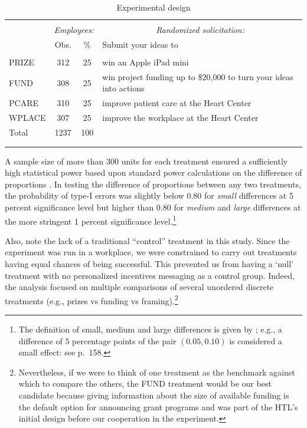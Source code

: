 \documentclass[11pt, titlepage]{article}
\begin{document}
\begin{table}
\centering
\caption{Experimental design}
\label{experimental-design}
\begin{tabular}{@{}lccp{10cm}}
  \\[-1.8ex]\hline \hline \\[-1.8ex]
 & \multicolumn{2}{c}{\emph{Employees:}}& \multicolumn{1}{c}{\emph{Randomized solicitation:}}\\
 \cmidrule(lr){2-3} & Obs. & \% & Submit your ideas to \\ 
  \hline \\[-1.86ex]
PRIZE & 312 & 25 & win an Apple iPad mini \\ 
  [1.8ex] FUND & 308 & 25 & win project funding up to \$20,000 to turn your ideas into actions \\ 
  [1.8ex] PCARE & 310 & 25 & improve patient care at the Heart Center \\ 
  [1.8ex] WPLACE & 307 & 25 & improve the workplace at the Heart Center \\ 
  [1.8ex] Total & 1237 & 100 &  \\ 
   \\[-1.8ex]\hline \hline \\[-1.8ex]
\end{tabular}
\end{table}

A sample size of more than 300 units for each treatment ensured a
sufficiently high statistical power based upon standard power
calculations on the difference of proportions \citep{cohen1992power}. In
testing the difference of proportions between any two treatments, the
probability of type-I errors was slightly below \(0.80\) for
\emph{small} differences at 5 percent significance level but higher than
\(0.80\) for \emph{medium} and \emph{large} differences at the more
stringent 1 percent significance level.\footnote{The definition of
  small, medium and large differences is given by
  \citet{cohen1992power}; e.g., a difference of 5 percentage points of
  the pair \((0.05, 0.10)\) is considered a small effect: see
  \citet{cohen1992power} p.~158.}

Also, note the lack of a traditional ``control'' treatment in this
study. Since the experiment was run in a workplace, we were constrained
to carry out treatments having equal chances of being successful. This
prevented us from having a `null' treatment with no personalized
incentives messaging as a control group. Indeed, the analysis focused on
multiple comparisons of several unordered discrete treatments (e.g.,
prizes vs funding vs framing).\footnote{Nevertheless, if we were to
  think of one treatment as the benchmark against which to compare the
  others, the FUND treatment would be our best candidate because giving
  information about the size of available funding is the default option
  for announcing grant programs and was part of the HTL's initial design
  before our cooperation in the experiment.}
\end{document}
